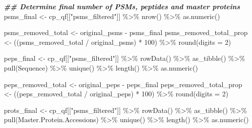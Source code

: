 \documentclass[9pt,a4paper,]{extarticle}
\newenvironment{Shaded}{\begin{snugshade}}{\end{snugshade}}
\newcommand{\AttributeTok}[1]{\textcolor[rgb]{0.77,0.63,0.00}{#1}}
\newcommand{\DecValTok}[1]{\textcolor[rgb]{0.00,0.00,0.81}{#1}}
\newcommand{\DocumentationTok}[1]{\textcolor[rgb]{0.56,0.35,0.01}{\textbf{\textit{#1}}}}
\newcommand{\FunctionTok}[1]{\textcolor[rgb]{0.00,0.00,0.00}{#1}}
\newcommand{\NormalTok}[1]{#1}
\newcommand{\OtherTok}[1]{\textcolor[rgb]{0.56,0.35,0.01}{#1}}
\newcommand{\SpecialCharTok}[1]{\textcolor[rgb]{0.00,0.00,0.00}{#1}}
\newcommand{\StringTok}[1]{\textcolor[rgb]{0.31,0.60,0.02}{#1}}
\begin{document}
\begin{Shaded}
\begin{Highlighting}[]
\DocumentationTok{\#\# Determine final number of PSMs, peptides and master proteins}
\NormalTok{psms\_final }\OtherTok{\textless{}{-}}\NormalTok{ cp\_qf[[}\StringTok{"psms\_filtered"}\NormalTok{]] }\SpecialCharTok{\%\textgreater{}\%}
  \FunctionTok{nrow}\NormalTok{() }\SpecialCharTok{\%\textgreater{}\%}
  \FunctionTok{as.numeric}\NormalTok{()}

\NormalTok{psms\_removed\_total }\OtherTok{\textless{}{-}}\NormalTok{ original\_psms }\SpecialCharTok{{-}}\NormalTok{ psms\_final}
\NormalTok{psms\_removed\_total\_prop }\OtherTok{\textless{}{-}}\NormalTok{ ((psms\_removed\_total }\SpecialCharTok{/}\NormalTok{ original\_psms) }\SpecialCharTok{*} \DecValTok{100}\NormalTok{) }\SpecialCharTok{\%\textgreater{}\%}
  \FunctionTok{round}\NormalTok{(}\AttributeTok{digits =} \DecValTok{2}\NormalTok{)}

\NormalTok{peps\_final }\OtherTok{\textless{}{-}}\NormalTok{ cp\_qf[[}\StringTok{"psms\_filtered"}\NormalTok{]] }\SpecialCharTok{\%\textgreater{}\%}
  \FunctionTok{rowData}\NormalTok{() }\SpecialCharTok{\%\textgreater{}\%}
  \FunctionTok{as\_tibble}\NormalTok{() }\SpecialCharTok{\%\textgreater{}\%}
  \FunctionTok{pull}\NormalTok{(Sequence) }\SpecialCharTok{\%\textgreater{}\%}
  \FunctionTok{unique}\NormalTok{() }\SpecialCharTok{\%\textgreater{}\%}
  \FunctionTok{length}\NormalTok{() }\SpecialCharTok{\%\textgreater{}\%}
  \FunctionTok{as.numeric}\NormalTok{()}

\NormalTok{peps\_removed\_total }\OtherTok{\textless{}{-}}\NormalTok{ original\_peps }\SpecialCharTok{{-}}\NormalTok{ peps\_final}
\NormalTok{peps\_removed\_total\_prop }\OtherTok{\textless{}{-}}\NormalTok{ ((peps\_removed\_total }\SpecialCharTok{/}\NormalTok{ original\_peps) }\SpecialCharTok{*} \DecValTok{100}\NormalTok{) }\SpecialCharTok{\%\textgreater{}\%}
  \FunctionTok{round}\NormalTok{(}\AttributeTok{digits =} \DecValTok{2}\NormalTok{)}

\NormalTok{prots\_final }\OtherTok{\textless{}{-}}\NormalTok{ cp\_qf[[}\StringTok{"psms\_filtered"}\NormalTok{]] }\SpecialCharTok{\%\textgreater{}\%}
  \FunctionTok{rowData}\NormalTok{() }\SpecialCharTok{\%\textgreater{}\%}
  \FunctionTok{as\_tibble}\NormalTok{() }\SpecialCharTok{\%\textgreater{}\%}
  \FunctionTok{pull}\NormalTok{(Master.Protein.Accessions) }\SpecialCharTok{\%\textgreater{}\%}
  \FunctionTok{unique}\NormalTok{() }\SpecialCharTok{\%\textgreater{}\%}
  \FunctionTok{length}\NormalTok{() }\SpecialCharTok{\%\textgreater{}\%}
  \FunctionTok{as.numeric}\NormalTok{()}


\end{Highlighting}
\end{Shaded}
\end{document}
